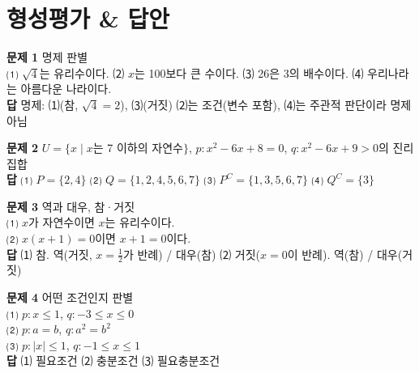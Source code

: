 \documentclass[11pt,a4paper]{article}
\begin{document}
\section{형성평가 \& 답안}
\begin{minipage}[t]{0.48\linewidth}
\begin{answerbox}
\textbf{문제 1} \quad 명제 판별\\
\small ⑴ $\sqrt4$는 유리수이다. ⑵ $x$는 100보다 큰 수이다. ⑶ 26은 3의 배수이다. ⑷ 우리나라는 아름다운 나라이다.\\[4pt]
\textbf{\color{goldstrong}답} \; 명제: ⑴(참, $\sqrt4=2$), ⑶(거짓) \quad ⑵는 조건(변수 포함), ⑷는 주관적 판단이라 명제 아님
\end{answerbox}
\end{minipage}\hfill
\begin{minipage}[t]{0.48\linewidth}
\begin{answerbox}
\textbf{문제 2} \quad $U=\{x\mid x$는 7 이하의 자연수$\}$, $p:x^2-6x+8=0$, $q:x^2-6x+9>0$의 진리집합\\[4pt]
\textbf{\color{goldstrong}답} \; ⑴ $P=\{2,4\}$ \; ⑵ $Q=\{1,2,4,5,6,7\}$ \; ⑶ $P^C=\{1,3,5,6,7\}$ \; ⑷ $Q^C=\{3\}$
\end{answerbox}
\end{minipage}

\vspace{6pt}
\begin{minipage}[t]{0.48\linewidth}
\begin{answerbox}
\textbf{문제 3} \quad 역과 대우, 참·거짓\\
\small ⑴ $x$가 자연수이면 $x$는 유리수이다.\\
⑵ $x(x+1)=0$이면 $x+1=0$이다.\\[4pt]
\textbf{\color{goldstrong}답} \; ⑴ 참. 역(거짓, $x=\frac12$가 반례) / 대우(참) \quad ⑵ 거짓($x=0$이 반례). 역(참) / 대우(거짓)
\end{answerbox}
\end{minipage}\hfill
\begin{minipage}[t]{0.48\linewidth}
\begin{answerbox}
\textbf{문제 4} \quad 어떤 조건인지 판별\\
\small ⑴ $p:x\le1$, $q:-3\le x\le0$\\
⑵ $p:a=b$, $q:a^2=b^2$\\
⑶ $p:|x|\le1$, $q:-1\le x\le1$\\[4pt]
\textbf{\color{goldstrong}답} \; ⑴ 필요조건 \; ⑵ 충분조건 \; ⑶ 필요충분조건
\end{answerbox}
\end{minipage}
\end{document}
